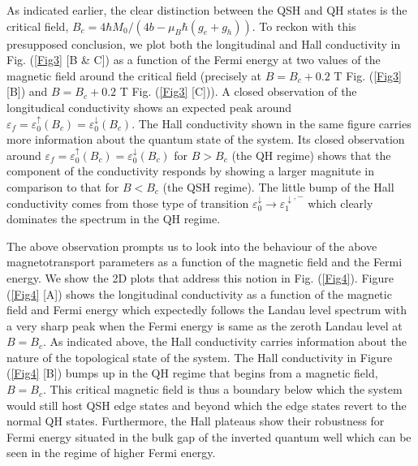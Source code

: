 \documentclass[prb,twocolumn]{revtex4-1}
\begin{document}
As indicated earlier, the clear distinction between the QSH and QH states is the critical field, $B_c=4\hbar M_0/(4b-\mu_B\hbar (g_e+g_h))$. To reckon with this presupposed conclusion, we plot both the longitudinal and Hall conductivity in Fig. (\ref{Fig3} [B \& C]) as a function of the Fermi energy at two values of the magnetic field around the critical field (precisely at $B=B_c+0.2$  T Fig. (\ref{Fig3} [B]) and $B=B_c+0.2$ T Fig. (\ref{Fig3} [C])). A closed observation of the longitudical conductivity shows an expected peak around $\varepsilon_f=\varepsilon_0^\uparrow(B_c)=\varepsilon_0^\downarrow(B_c)$. The Hall conductivity shown in the same figure carries more information about the quantum state of the system. Its closed observation around $\varepsilon_f=\varepsilon_0^\uparrow(B_c)=\varepsilon_0^\downarrow(B_c)$ for $B>B_c$ (the QH regime) shows that the component of the conductivity responds by showing a larger magnitute in comparison to that for $B<B_c$ (the QSH regime). The little bump of the Hall conductivity comes from those type of transition $\varepsilon_0^\downarrow\rightarrow \varepsilon_1^{\downarrow,-}$ which clearly dominates the spectrum in the QH regime.


The above observation prompts us to look into the behaviour of the above magnetotransport parameters as a function of the magnetic field and the Fermi energy. We show the 2D plots that address this notion in Fig. (\ref{Fig4}). Figure (\ref{Fig4} [A]) shows the longitudinal conductivity as a function of the magnetic field and Fermi energy which expectedly follows the Landau level spectrum with a very sharp peak when the Fermi energy is same as the zeroth Landau level at $B=B_c$. As indicated above, the Hall conductivity carries information about the nature of the topological state of the system. The Hall conductivity in Figure (\ref{Fig4} [B]) bumps up in the QH regime that begins from a magnetic field, $B=B_c$. This critical magnetic field is thus a boundary below which the system would still host QSH edge states and beyond which the edge states revert to the normal QH states. Furthermore, the Hall plateaus show their robustness for Fermi energy situated in the bulk gap of the inverted quantum well which can be seen in the regime of higher Fermi energy. 
\end{document}
